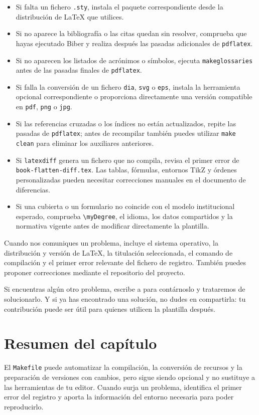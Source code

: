 \begin{itemize}
  \item Si falta un fichero \texttt{.sty}, instala el paquete correspondiente desde la distribución de \LaTeX{} que utilices.
  \item Si no aparece la bibliografía o las citas quedan sin resolver, comprueba que hayas ejecutado Biber y realiza después las pasadas adicionales de \texttt{pdflatex}.
  \item Si no aparecen los listados de acrónimos o símbolos, ejecuta \texttt{makeglossaries} antes de las pasadas finales de \texttt{pdflatex}.
  \item Si falla la conversión de un fichero \texttt{dia}, \texttt{svg} o \texttt{eps}, instala la herramienta opcional correspondiente o proporciona directamente una versión compatible en \texttt{pdf}, \texttt{png} o \texttt{jpg}.
  \item Si las referencias cruzadas o los índices no están actualizados, repite las pasadas de \texttt{pdflatex}; antes de recompilar también puedes utilizar \texttt{make clean} para eliminar los auxiliares anteriores.
  \item Si \texttt{latexdiff} genera un fichero que no compila, revisa el primer error de \texttt{book-flatten-diff.tex}. Las tablas, fórmulas, entornos TikZ y órdenes personalizadas pueden necesitar correcciones manuales en el documento de diferencias.
  \item Si una cubierta o un formulario no coincide con el modelo institucional esperado, comprueba \texttt{\textbackslash{}myDegree}, el idioma, los datos compartidos y la normativa vigente antes de modificar directamente la plantilla.
\end{itemize}

Cuando nos comuniques un problema, incluye el sistema operativo, la distribución y versión de \LaTeX{}, la titulación seleccionada, el comando de compilación y el primer error relevante del fichero de registro. También puedes proponer correcciones mediante el repositorio del proyecto.

Si encuentras algún otro problema, escribe a \contactauthor{} para contárnoslo y trataremos de solucionarlo. Y si ya has encontrado una solución, no dudes en compartirla: tu contribución puede ser útil para quienes utilicen la plantilla después.


\section{Resumen del capítulo}
\label{sec:resumen-compilacion-avanzada}

El \texttt{Makefile} puede automatizar la compilación, la conversión de recursos y la preparación de versiones con cambios, pero sigue siendo opcional y no sustituye a las herramientas de tu editor. Cuando surja un problema, identifica el primer error del registro y aporta la información del entorno necesaria para poder reproducirlo.









